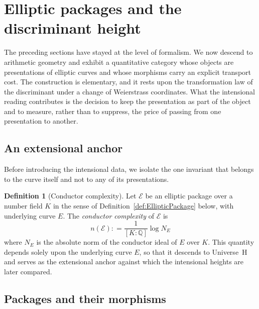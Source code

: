 \documentclass[10pt, reqno]{amsart}
\theoremstyle{plain}
\theoremstyle{definition}
\newtheorem{definition}[theorem]{Definition}
\theoremstyle{plain}
\newcommand{\Q}{\mathbb{Q}}
\newcommand{\coloneqq}{\mathrel{\mathop:}=}
\begin{document}
\section{Elliptic packages and the discriminant height}\label{sec:EllipticPackages}

The preceding sections have stayed at the level of formalism. We now descend to arithmetic geometry and exhibit a quantitative category whose objects are presentations of elliptic curves and whose morphisms carry an explicit transport cost. The construction is elementary, and it rests upon the transformation law of the discriminant under a change of Weierstrass coordinates. What the intensional reading contributes is the decision to keep the presentation as part of the object and to measure, rather than to suppress, the price of passing from one presentation to another.

\subsection{An extensional anchor}\label{subsec:ConductorComplexity}

Before introducing the intensional data, we isolate the one invariant that belongs to the curve itself and not to any of its presentations.

\begin{definition}[Conductor complexity]\label{def:ConductorComplexity}
Let $\mathcal{E}$ be an elliptic package over a number field $K$ in the sense of Definition~\ref{def:EllipticPackage} below, with underlying curve $E$. The \emph{conductor complexity} of $\mathcal{E}$ is
\[
n(\mathcal{E}) \coloneqq \frac{1}{[K:\Q]} \log N_E
\]
where $N_E$ is the absolute norm of the conductor ideal of $E$ over $K$. This quantity depends solely upon the underlying curve $E$, so that it descends to Universe~H and serves as the extensional anchor against which the intensional heights are later compared.
\end{definition}

\subsection{Packages and their morphisms}\label{subsec:EllPkgDef}
\end{document}
